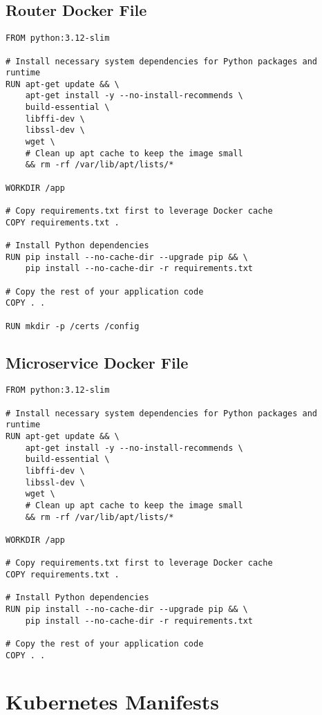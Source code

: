 \subsection{Router Docker File}
\begin{lstlisting}[breaklines=true, caption={Router Docker File}]
FROM python:3.12-slim

# Install necessary system dependencies for Python packages and runtime
RUN apt-get update && \
    apt-get install -y --no-install-recommends \
    build-essential \
    libffi-dev \
    libssl-dev \
    wget \
    # Clean up apt cache to keep the image small
    && rm -rf /var/lib/apt/lists/*

WORKDIR /app

# Copy requirements.txt first to leverage Docker cache
COPY requirements.txt .

# Install Python dependencies
RUN pip install --no-cache-dir --upgrade pip && \
    pip install --no-cache-dir -r requirements.txt

# Copy the rest of your application code
COPY . .

RUN mkdir -p /certs /config

\end{lstlisting}

\subsection{Microservice Docker File}

\begin{lstlisting}[breaklines=true, caption={Microservice Docker File}]
FROM python:3.12-slim

# Install necessary system dependencies for Python packages and runtime
RUN apt-get update && \
    apt-get install -y --no-install-recommends \
    build-essential \
    libffi-dev \
    libssl-dev \
    wget \
    # Clean up apt cache to keep the image small
    && rm -rf /var/lib/apt/lists/*

WORKDIR /app

# Copy requirements.txt first to leverage Docker cache
COPY requirements.txt .

# Install Python dependencies
RUN pip install --no-cache-dir --upgrade pip && \
    pip install --no-cache-dir -r requirements.txt

# Copy the rest of your application code
COPY . .
\end{lstlisting}

\section{Kubernetes Manifests}

